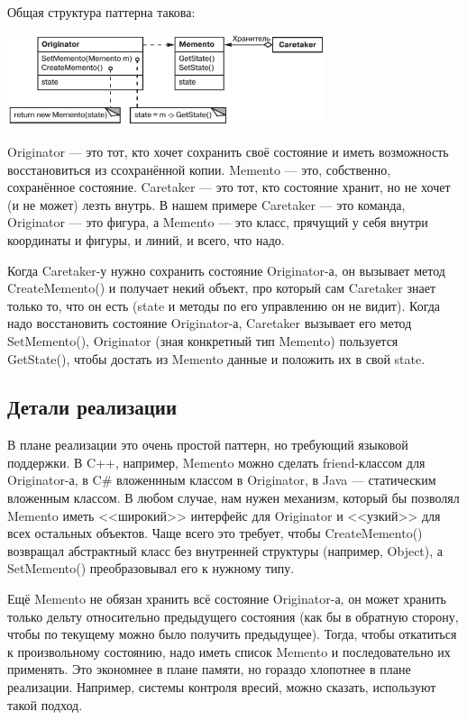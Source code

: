 \documentclass{../../text-style}
\begin{document}
Общая структура паттерна такова:

\begin{center}
    \includegraphics[width=0.7\textwidth]{memento.png}
\end{center}

Originator --- это тот, кто хочет сохранить своё состояние и иметь возможность восстановиться из ссохранённой копии. Memento --- это, собственно, сохранённое состояние. Caretaker --- это тот, кто состояние хранит, но не хочет (и не может) лезть внутрь. В нашем примере Caretaker --- это команда, Originator --- это фигура, а Memento --- это класс, прячущий у себя внутри координаты и фигуры, и линий, и всего, что надо.

Когда Caretaker-у нужно сохранить состояние Originator-а, он вызывает метод CreateMemento() и получает некий объект, про который сам Caretaker знает только то, что он есть (state и методы по его управлению он не видит). Когда надо восстановить состояние Originator-а, Caretaker вызывает его метод SetMemento(), Originator (зная конкретный тип Memento) пользуется GetState(), чтобы достать из Memento данные и положить их в свой state.

\subsection{Детали реализации}

В плане реализации это очень простой паттерн, но требующий языковой поддержки. В C++, например, Memento можно сделать friend-классом для Originator-а, в C\# вложеннным классом в Originator, в Java --- статическим вложенным классом. В любом случае, нам нужен механизм, который бы позволял Memento иметь <<широкий>> интерфейс для Originator и <<узкий>> для всех остальных объектов. Чаще всего это требует, чтобы CreateMemento() возвращал абстрактный класс без внутренней структуры (например, Object), а SetMemento() преобразовывал его к нужному типу.

Ещё Memento не обязан хранить всё состояние Originator-а, он может хранить только дельту относительно предыдущего состояния (как бы в обратную сторону, чтобы по текущему можно было получить предыдущее). Тогда, чтобы откатиться к произвольному состоянию, надо иметь список Memento и последовательно их применять. Это экономнее в плане памяти, но гораздо хлопотнее в плане реализации. Например, системы контроля вресий, можно сказать, используют такой подход.
\end{document}
